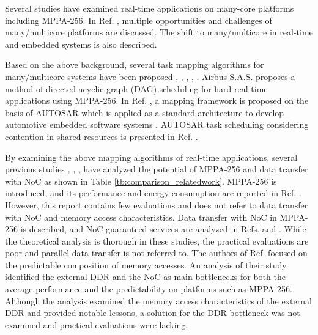 \documentclass{sig-alternate-05-2015}
\begin{document}
Several studies have examined real-time applications on many-core platforms including MPPA-256.
In Ref. \cite{saidi2015shift}, multiple opportunities and challenges of many/multicore platforms are discussed.
The shift to many/multicore in real-time and embedded systems is also described. 

Based on the above background, several task mapping algorithms for many/multicore systems have been proposed \cite{perret2016mapping}, \cite{puffitsch2015off}, \cite{carle2014static}, \cite{becker2014mapping}, \cite{faragardi2014communication}.
Airbus S.A.S. \cite{perret2016mapping} proposes a method of directed acyclic graph (DAG) scheduling for hard real-time applications using MPPA-256.
In Ref. \cite{faragardi2014communication}, a mapping framework is proposed on the basis of AUTOSAR which is applied as a standard architecture to develop automotive embedded software systems \cite{furst2009autosar}.
AUTOSAR task scheduling considering contention in shared resources is presented in Ref. \cite{becker2016contention}.

By examining the above mapping algorithms of real-time applications, several previous studies \cite{kanter2015kalray}, \cite{denet2017work}, \cite{deDinechin2014GSN}, \cite{perret2016predictable} have analyzed the potential of MPPA-256 and data transfer with NoC as shown in Table \ref{tb:comparison_relatedwork}.
MPPA-256 is introduced, and its performance and energy consumption are reported in Ref. \cite{kanter2015kalray}.
However, this report contains few evaluations and does not refer to data transfer with NoC and memory access characteristics.
Data transfer with NoC in MPPA-256 is described, and NoC guaranteed services are analyzed in Refs. \cite{denet2017work} and \cite{deDinechin2014GSN}.
While the theoretical analysis is thorough in these studies, the practical evaluations are poor and parallel data transfer is not referred to.
The authors of Ref. \cite{perret2016predictable} focused on the predictable composition of memory accesses.
An analysis of their study identified the external DDR and the NoC as main bottlenecks for both the average performance and the predictability on platforms such as MPPA-256.
Although the analysis examined the memory access characteristics of the external DDR and provided notable lessons, a solution for the DDR bottleneck was not examined and practical evaluations were lacking.
\end{document}
